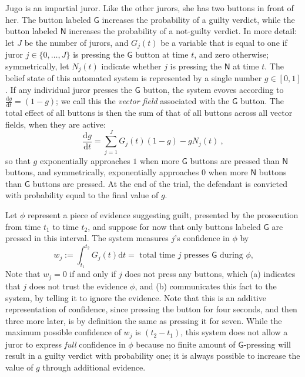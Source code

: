 \documentclass{uai2023}
\theoremstyle{plain}
\theoremstyle{definition}
\begin{document}
\begin{example}\label{ex:jugo}
Jugo is an impartial juror.
Like the other jurors, she has two buttons in front of her.
The button labeled $\mathsf G$ increases the probability 
of a guilty verdict, while the button labeled $\mathsf N$ increases
the probability of a not-guilty verdict. 
In more detail: let $J$ be the number of jurors, and $G_j(t)$ be
a variable that is equal to one if juror $j \in \{0, \ldots, J\}$
is pressing the $\mathsf G$ button at time $t$, and zero otherwise; 
symmetrically, let $N_j(t)$ indicate whether $j$ is pressing the $\mathsf N$ at 
time $t$. The belief state of this automated system is
represented by a single number $g \in [0,1]$.
If any individual juror presses the $\mathsf G$ button, 
the system evoves according to $\frac{\mathrm dg}{\mathrm dt} = (1-g)$;
we call this the \emph{vector field} associated with the $\mathsf G$ button.
The total effect of all buttons is then the sum of that of all buttons
across all vector fields, when they are active: 
\[
	\frac{\mathrm dg}{\mathrm dt} = 
	\sum_{j = 1}^J G_j(t) (1-g) 
		- g N_j(t)~,
                \]
so that $g$ exponentially approaches $1$ when more $\mathsf G$ buttons
                are pressed than $\mathsf N$ buttons, 
and symmetrically, exponentially approaches $0$ when more $\mathsf N$
                buttons than $\mathsf G$ buttons are pressed. 
At the end of the trial, the defendant is convicted with probability
equal to the final value of $g$. 

Let $\phi$ represent a piece of evidence suggesting guilt, presented by the
prosecution from time $t_1$ to time $t_2$,
and suppose for now that only buttons labeled $\mathsf G$ are pressed
in this interval.
The system measures $j$'s confidence in $\phi$ by
\[
	w_j := \!\int_{t_1}^{t_2}\!\! G_j(t) \mathrm d t 
	= \text{ total time $j$ presses $\mathsf G$ during $\phi$,}
\]
Note that $w_j = 0$ if and only if $j$ does not press any buttons,
which (a) indicates that $j$ does not trust the evidence $\phi$, 
and (b) communicates this fact to the system, by telling it to ignore 
the evidence. 
Note that this is an additive representation of confidence, since
pressing the button for four seconds, and then three more later, is
by definition the same as pressing it for seven. 
While the maximum possible confidence of $w_j$ is $(t_2 - t_1)$,
this system does not allow a juror to express \emph{full} confidence in $\phi$
because no finite amount of $\mathsf G$-pressing will result in a 
guilty verdict with probability one; it is always possible to increase
the value of $g$ through additional evidence. 


\end{example}
\end{document}
